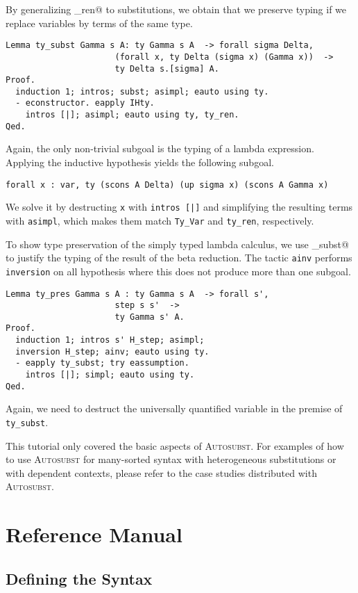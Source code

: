 \documentclass{scrartcl}
\newcommand{\Autosubst}{\textsc{Autosubst}\xspace}
\newcommand{\lst}{\lstinline}
\begin{document}
By generalizing \lst@ty_ren@ to substitutions, we obtain that we preserve typing if we replace variables by terms of the same type.
\begin{lstlisting}
Lemma ty_subst Gamma s A: ty Gamma s A  -> forall sigma Delta,
                      (forall x, ty Delta (sigma x) (Gamma x))  ->
                      ty Delta s.[sigma] A.
Proof.
  induction 1; intros; subst; asimpl; eauto using ty. 
  - econstructor. eapply IHty.
    intros [|]; asimpl; eauto using ty, ty_ren.
Qed.
\end{lstlisting}
Again, the only non-trivial subgoal is the typing of a lambda expression. Applying the inductive hypothesis yields the following subgoal.
\begin{center}
  \lst$forall x : var, ty (scons A Delta) (up sigma x) (scons A Gamma x)$
\end{center}
We solve it by destructing \lst$x$ with \lst$intros [|]$ and simplifying the resulting terms with \lst$asimpl$, which makes them match \lst$Ty_Var$ and \lst$ty_ren$, respectively.

To show type preservation of the simply typed lambda calculus, we use \lst@ty_subst@ to justify the typing of the result of the beta reduction.
The tactic \lst$ainv$ performs \lst$inversion$ on all hypothesis where this does not produce more than one subgoal.
\begin{lstlisting}
Lemma ty_pres Gamma s A : ty Gamma s A  -> forall s', 
                      step s s'  -> 
                      ty Gamma s' A.
Proof.
  induction 1; intros s' H_step; asimpl;
  inversion H_step; ainv; eauto using ty.
  - eapply ty_subst; try eassumption.
    intros [|]; simpl; eauto using ty.
Qed.      
\end{lstlisting}
Again, we need to destruct the universally quantified variable in the premise of \lst$ty_subst$.

This tutorial only covered the basic aspects of \Autosubst. For examples of how to use \Autosubst for many-sorted syntax with heterogeneous substitutions or with dependent contexts, please refer to the case studies distributed with \Autosubst.

\section{Reference Manual}
\label{sec:manual}

\subsection{Defining the Syntax}
\label{sec:defining-syntax}
\end{document}
